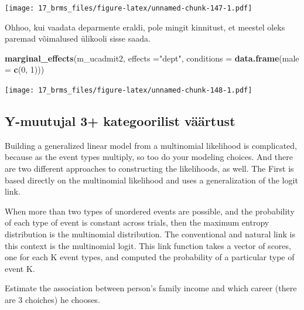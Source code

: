 \documentclass[]{book}
\newenvironment{Shaded}{\begin{snugshade}}{\end{snugshade}}
\newcommand{\DataTypeTok}[1]{\textcolor[rgb]{0.13,0.29,0.53}{#1}}
\newcommand{\DecValTok}[1]{\textcolor[rgb]{0.00,0.00,0.81}{#1}}
\newcommand{\KeywordTok}[1]{\textcolor[rgb]{0.13,0.29,0.53}{\textbf{#1}}}
\newcommand{\NormalTok}[1]{#1}
\newcommand{\StringTok}[1]{\textcolor[rgb]{0.31,0.60,0.02}{#1}}
\begin{document}
\texttt{[image: 17\_brms\_files/figure-latex/unnamed-chunk-147-1.pdf]}

Ohhoo, kui vaadata deparmente eraldi, pole mingit kinnitust, et meestel oleks paremad võimalused ülikooli sisse saada.

\begin{Shaded}
\begin{Highlighting}[]
\KeywordTok{marginal_effects}\NormalTok{(m_ucadmit2, }\DataTypeTok{effects =}\StringTok{"dept"}\NormalTok{, }\DataTypeTok{conditions =} \KeywordTok{data.frame}\NormalTok{(}\DataTypeTok{male =} \KeywordTok{c}\NormalTok{(}\DecValTok{0}\NormalTok{, }\DecValTok{1}\NormalTok{)))}
\end{Highlighting}
\end{Shaded}

\texttt{[image: 17\_brms\_files/figure-latex/unnamed-chunk-148-1.pdf]}

\hypertarget{y-muutujal-3-kategoorilist-vaartust}{%
\subsection{Y-muutujal 3+ kategoorilist väärtust}\label{y-muutujal-3-kategoorilist-vaartust}}

Building a generalized linear model from a multinomial likelihood is complicated, because as the event types multiply, so too do your modeling choices. And there are two different approaches to constructing the likelihoods, as well. The First is based directly on the multinomial likelihood and uses a generalization of the logit link.

When more than two types of unordered events are possible, and the probability of each type of event is constant across trials, then the maximum entropy distribution is the multinomial distribution. The conventional and natural link is this context is the multinomial logit. This link function takes a vector of scores, one for each K event types, and computed the probability of a particular type of event K.

Estimate the association between person's family income and which career (there are 3 choiches) he chooses.
\end{document}
